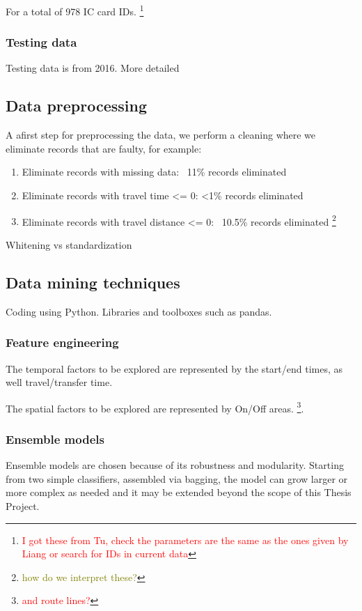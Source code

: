 \documentclass{article}
\newcommand{\selfnote}[1]{\footnote{\textcolor{red}{#1}}}
\newcommand{\Liangdoubt}[1]{\footnote{\textcolor{olive}{#1}}}
\begin{document}
For a total of 978 IC card IDs. \selfnote{I got these from Tu, check the parameters are the same as the ones given by Liang or search for IDs in current data}

\subsubsection{Testing data}
Testing data is from 2016. More detailed

\subsection{Data preprocessing}
A  afirst step for preprocessing the data, we perform a cleaning where we eliminate records that are faulty, for example: 

\begin{enumerate}
\item Eliminate records with missing data: ~11\% records eliminated
\item Eliminate records with travel time <= 0: <1\% records eliminated
\item Eliminate records with travel distance <= 0: ~10.5\% records eliminated \Liangdoubt{how do we interpret these?}
\end{enumerate}



Whitening vs standardization

\subsection{Data mining techniques}
Coding using Python. Libraries and toolboxes such as pandas.

\subsubsection{Feature engineering}
The temporal factors to be explored are represented by the start/end times, as well travel/transfer time.

The spatial factors to be explored are represented by On/Off areas. \selfnote{and route lines?}. 

\subsubsection{Ensemble models}
Ensemble models are chosen because of its robustness and modularity. Starting from two simple classifiers, assembled via bagging, the model can grow larger or more complex as needed and it may be extended beyond the scope of this Thesis Project. 
\end{document}
